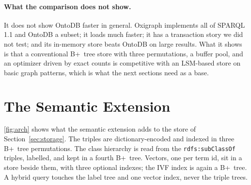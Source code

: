 \documentclass[sigconf, nonacm]{acmart}
\newcommand{\sys}{OntoDB}
\newcommand{\code}[1]{\texttt{#1}}
\begin{document}


\paragraph{What the comparison does not show.} It does not show \sys{} faster in general. Oxigraph implements all of SPARQL 1.1 and \sys{} a subset; it loads much faster; it has a transaction story we did not test; and its in-memory store beats \sys{} on large results. What it shows is that a conventional B+~tree store with three permutations, a buffer pool, and an optimizer driven by exact counts is competitive with an LSM-based store on basic graph patterns, which is what the next sections need as a base.

\section{The Semantic Extension}
\label{sec:overview}

\autoref{fig:arch} shows what the semantic extension adds to the store of Section~\ref{sec:storage}. The triples are dictionary-encoded and indexed in three B+~tree permutations. The class hierarchy is read from the \code{rdfs:subClassOf} triples, labelled, and kept in a fourth B+~tree. Vectors, one per term id, sit in a store beside them, with three optional indexes; the IVF index is again a B+~tree. A hybrid query touches the label tree and one vector index, never the triple trees.
\end{document}

